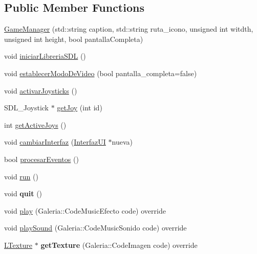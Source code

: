 \subsection*{Public Member Functions}
\begin{DoxyCompactItemize}
\item 
\hyperlink{class_game_manager_ad42e6937ed9cacf6570a002a6a7abb56}{Game\+Manager} (std\+::string caption, std\+::string ruta\+\_\+icono, unsigned int witdth, unsigned int height, bool pantalla\+Completa)
\item 
void \hyperlink{class_game_manager_aeaaa62ac9dff043fb89932663744d7ea}{iniciar\+Libreria\+S\+DL} ()
\item 
void \hyperlink{class_game_manager_a215db619b1bc7d33fd0286fd3dc58000}{establecer\+Modo\+De\+Video} (bool pantalla\+\_\+completa=false)
\item 
void \hyperlink{class_game_manager_ac40f7fb97ee52c4a4a9361aca98dfac5}{activar\+Joysticks} ()
\item 
S\+D\+L\+\_\+\+Joystick $\ast$ \hyperlink{class_game_manager_a9bb21d9af524ae6c72bdd8dc109ce957}{get\+Joy} (int id)
\item 
int \hyperlink{class_game_manager_ae47edae1e15eaf1d4624cc4e66a9f559}{get\+Active\+Joys} ()
\item 
void \hyperlink{class_game_manager_a1a7ef9efef7dffba5887409b2008f833}{cambiar\+Interfaz} (\hyperlink{class_interfaz_u_i}{Interfaz\+UI} $\ast$nueva)
\item 
bool \hyperlink{class_game_manager_aeb38bf2a7f818f76f79f30bce0a72f57}{procesar\+Eventos} ()
\item 
void \hyperlink{class_game_manager_abbde8090c24ca199815ba1e85059c96f}{run} ()
\item 
void {\bfseries quit} ()\hypertarget{class_game_manager_ac63aa477ce3707e03b42968d364a6ce6}{}\label{class_game_manager_ac63aa477ce3707e03b42968d364a6ce6}

\item 
void \hyperlink{class_game_manager_ae693cf42cfb96a0bb6d7de8fad55739d}{play} (Galeria\+::\+Code\+Music\+Efecto code) override
\item 
void \hyperlink{class_game_manager_a55482db663320dd82b11bb221049bd98}{play\+Sound} (Galeria\+::\+Code\+Music\+Sonido code) override
\item 
\hyperlink{class_l_texture}{L\+Texture} $\ast$ {\bfseries get\+Texture} (Galeria\+::\+Code\+Imagen code) override\hypertarget{class_game_manager_aafcc260a50dd3fa22e8e9fd926997418}{}\label{class_game_manager_aafcc260a50dd3fa22e8e9fd926997418}


\end{DoxyCompactItemize}
